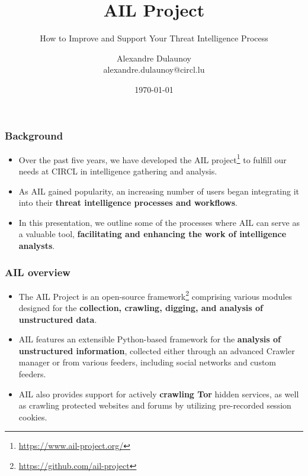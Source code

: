 \documentclass{beamer}
\author{\large{Alexandre Dulaunoy}\\ \scriptsize{alexandre.dulaunoy@circl.lu}}
\title{AIL Project}
\subtitle{How to Improve and Support Your Threat Intelligence Process}
\institute{info@circl.lu}
\date{\today}
\begin{document}
\begin{frame}[t,plain]
\titlepage
\end{frame}

\begin{frame}
   \frametitle{Background}
\begin{itemize}
    \item Over the past five years, we have developed the AIL project\footnote{\url{https://www.ail-project.org/}} to fulfill our needs at CIRCL in intelligence gathering and analysis.
    \item As AIL gained popularity, an increasing number of users began integrating it into their {\bf threat intelligence processes and workflows}.
    \item In this presentation, we outline some of the processes where AIL can serve as a valuable tool, {\bf facilitating and enhancing the work of intelligence analysts}.
\end{itemize}
\end{frame}

\begin{frame}
   \frametitle{AIL overview}
    \begin{itemize}
        \item The AIL Project is an open-source framework\footnote{\url{https://github.com/ail-project}} comprising various modules designed for the {\bf collection, crawling, digging, and analysis of unstructured data}.
        \item AIL features an extensible Python-based framework for the {\bf analysis of unstructured information}, collected either through an advanced Crawler manager or from various feeders, including social networks and custom feeders.
        \item AIL also provides support for actively {\bf crawling Tor} hidden services, as well as crawling protected websites and forums by utilizing pre-recorded session cookies.
    \end{itemize}
\end{frame}
\end{document}
